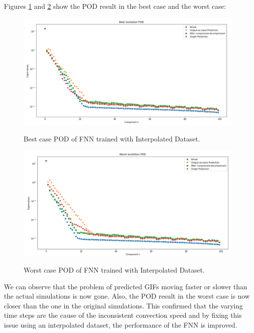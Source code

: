 Figures \ref{figure:FNN_interpolated_best_POD} and \ref{figure:FNN_interpolated_worst_POD} show the POD result in the best case and the worst case:

\begin{figure}[H]
    \caption{Best case POD of FNN trained with Interpolated Dataset.}
    \includegraphics[scale=0.5]{figures/mantle_convection_images/larger_dataset_interpolated/FNN_Best_POD.png}
    \label{figure:FNN_interpolated_best_POD}
\end{figure}

\begin{figure}[H]
    \caption{Worst case POD of FNN trained with Interpolated Dataset.}
    \includegraphics[scale=0.5]{figures/mantle_convection_images/larger_dataset_interpolated/FNN_Worst_POD.png}
    \label{figure:FNN_interpolated_worst_POD}
\end{figure}

We can observe that the problem of predicted GIFs moving faster or slower than the actual simulations is now gone. Also, the POD result in the worst case is now closer than the one in the original simulations. This confirmed that the varying time steps are the cause of the inconsistent convection speed and by fixing this issue using an interpolated dataset, the performance of the FNN is improved.


